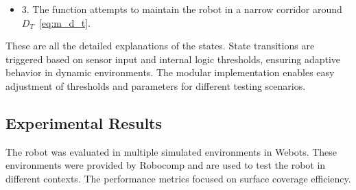 \documentclass[conference]{IEEEtran}
\begin{document}
\begin{itemize}
\begin{itemize}
        \item If $D_T - 100 < r < D_T + 10$ (too close to the wall):
        \begin{itemize}
            \item If $\phi < 0$ (wall is left and near): continue in \texttt{FOLLOW\_WALL} with speed of \texttt{150 mm/s} and angular speed of \texttt{+0.2 rad/s} (steer away).
            \item Else steer away the other side, with same linear speed and the same value of angular speed but with negative rotation.
        \end{itemize}
        \item Else (no special condition matched):
        \begin{itemize}
            \item Fall back to \textit{FORWARD} with linear speed of 600.0 mm/s (fast forward).
        \end{itemize}
    \end{itemize}
    \item 3. The function attempts to maintain the robot in a narrow corridor around $D_T$~\eqref{eq:m_d_t}.
\end{itemize}


These are all the detailed explanations of the states. State transitions are triggered based on sensor input and internal logic thresholds, ensuring adaptive behavior in dynamic environments. The modular implementation enables easy adjustment of thresholds and parameters for different testing scenarios.


\subsection{Experimental Results}
The robot was evaluated in multiple simulated environments in Webots. These environments were provided by Robocomp and are used to test the robot in different contexts. The performance metrics focused on surface coverage efficiency.
\end{document}
